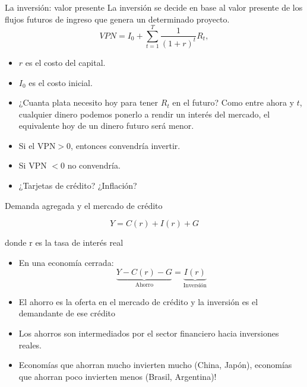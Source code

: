 \documentclass{beamer}
\begin{document}
\begin{frame}{La inversión: valor presente}
    La inversión se decide en base al valor presente de los flujos futuros de ingreso que genera un determinado proyecto.
    \begin{equation}
        VPN = I_0 + \sum_{t=1} ^{T} \frac{1}{(1+r)^t} R_t,
    \end{equation}
    \begin{itemize}
        \item $r$ es el costo del capital.
        \item $I_0$ es el costo inicial.
        \item ¿Cuanta plata necesito hoy para tener $R_t$ en el futuro? Como entre ahora y $t$, cualquier dinero podemos ponerlo a rendir un interés del mercado, el equivalente hoy de un dinero futuro será menor.
        \item Si el VPN$>0$, entonces convendría invertir.
        \item Si VPN $<0$ no convendría.
        \item ¿Tarjetas de crédito? ¿Inflación?
    \end{itemize}
\end{frame}

\begin{frame}{Demanda agregada y el mercado de crédito}

$$ Y = C(r) + I(r) + G $$

\centering \small{donde r es la tasa de interés real}

\begin{itemize}
\item En una economía cerrada:
\[
\underbrace{Y - C(r) - G}_{\text{Ahorro}} = \underbrace{I(r)}_{\text{Inversión}} 
\]
\end{itemize}
\begin{itemize}
\item El ahorro es la oferta en el mercado de crédito y la inversión es el demandante de ese crédito
\item Los ahorros son intermediados por el sector financiero hacia inversiones reales.
\item Economías que ahorran mucho invierten mucho (China, Japón), economías que ahorran poco invierten menos (Brasil, Argentina)! 
\end{itemize}
\end{frame}
\end{document}
